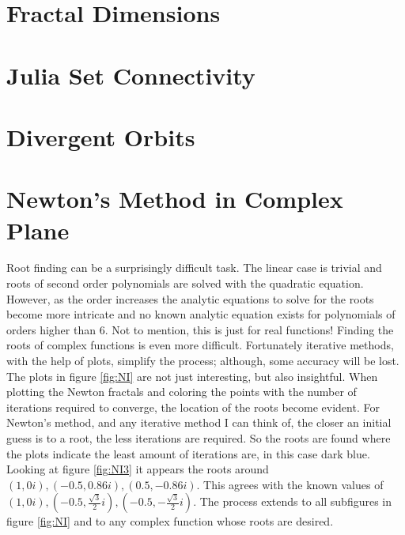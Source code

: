 \documentclass[letterpaper,11pt]{article}
\begin{document}
\section{Fractal Dimensions}

\section{Julia Set Connectivity}

\section{Divergent Orbits}

\section{Newton's Method in Complex Plane}
Root finding can be a surprisingly difficult task. The linear case is trivial and roots of second order polynomials are solved with the quadratic equation. However, as the order increases the analytic equations to solve for the roots become more intricate and no known analytic equation exists for polynomials of orders higher than 6. Not to mention, this is just for real functions! Finding the roots of complex functions is even more difficult. Fortunately iterative methods, with the help of plots, simplify the process; although, some accuracy will be lost. The plots in figure \ref{fig:NI} are not just interesting, but also insightful. When plotting the Newton fractals and coloring the points with the number of iterations required to converge, the location of the roots become evident. For Newton's method, and any iterative method I can think of, the closer an initial guess is to a root, the less iterations are required. So the roots are found where the plots indicate the least amount of iterations are, in this case dark blue. Looking at figure \ref{fig:NI3} it appears the roots around $(1,0i), (-0.5,0.86i), (0.5,-0.86i)$. This agrees with the known values of $(1,0i), (-0.5, \frac{\sqrt{3}}{2}i), (-0.5, -\frac{\sqrt{3}}{2}i)$. The process extends to all subfigures in figure \ref{fig:NI} and to any complex function whose roots are desired.
\end{document}
